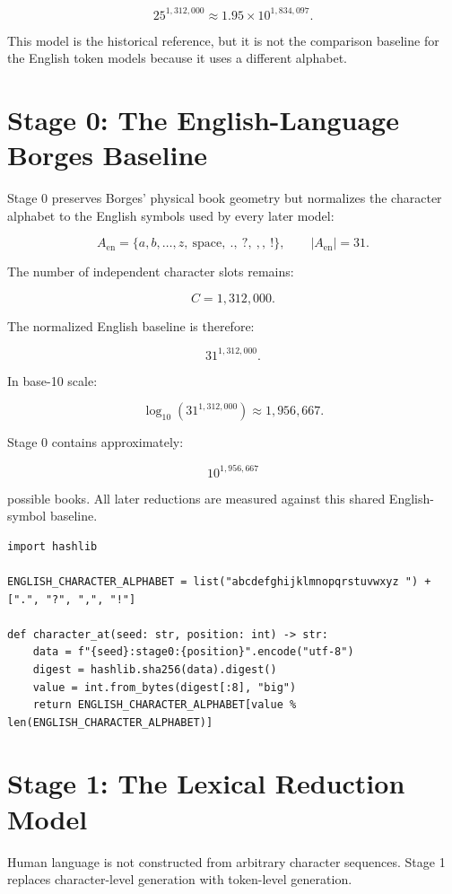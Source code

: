 \documentclass[11pt,a4paper]{article}
\begin{document}
\[
25^{1{,}312{,}000}
\approx
1.95 \times 10^{1{,}834{,}097}.
\]

This model is the historical reference, but it is not the comparison baseline for the English token models because it uses a different alphabet.

\section{Stage 0: The English-Language Borges Baseline}

Stage 0 preserves Borges' physical book geometry but normalizes the character alphabet to the English symbols used by every later model:

\[
A_{\mathrm{en}} = \{a,b,\ldots,z,\ \text{space},\ \mathtt{.},\ \mathtt{?},\ \mathtt{,},\ \mathtt{!}\},
\qquad |A_{\mathrm{en}}| = 31.
\]

The number of independent character slots remains:

\[
C = 1{,}312{,}000.
\]

The normalized English baseline is therefore:

\[
31^{1{,}312{,}000}.
\]

In base-10 scale:

\[
\log_{10}(31^{1{,}312{,}000}) \approx 1{,}956{,}667.
\]

Stage 0 contains approximately:

\[
10^{1{,}956{,}667}
\]

possible books. All later reductions are measured against this shared English-symbol baseline.

\begin{lstlisting}[style=pythonstyle]
import hashlib

ENGLISH_CHARACTER_ALPHABET = list("abcdefghijklmnopqrstuvwxyz ") + [".", "?", ",", "!"]

def character_at(seed: str, position: int) -> str:
    data = f"{seed}:stage0:{position}".encode("utf-8")
    digest = hashlib.sha256(data).digest()
    value = int.from_bytes(digest[:8], "big")
    return ENGLISH_CHARACTER_ALPHABET[value % len(ENGLISH_CHARACTER_ALPHABET)]
\end{lstlisting}

\section{Stage 1: The Lexical Reduction Model}

Human language is not constructed from arbitrary character sequences. Stage 1 replaces character-level generation with token-level generation.
\end{document}
